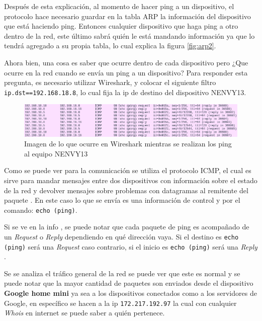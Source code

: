 \noindent Después de esta explicación, al momento de hacer ping a un dispositivo, el protocolo hace necesario guardar en la tabla ARP la información del dispositivo que está haciendo ping. Entonces cualquier dispositivo que haga ping a otro dentro de la red, este último sabrá quién le está mandando información ya que lo tendrá agregado a su propia tabla, lo cual explica la figura \ref{fig:arp2}. 


\noindent Ahora bien, una cosa es saber que ocurre dentro de cada dispositivo pero ¿Que ocurre en la red cuando se envía un ping a un dispositivo? Para responder esta pregunta, es necesario utilizar Wireshark, y colocar el siguiente filtro \verb|ip.dst==192.168.18.8|, lo cual fija la ip de destino del dispositivo NENVY13. 


\begin{figure}[!h]
	\centering
	\includegraphics[scale=0.5]{images/wire3.png}
	\caption{Imagen de lo que ocurre en Wireshark mientras se realizan los ping al equipo NENVY13}
	\label{diag:iperf3}
\end{figure}

\noindent Como se puede ver para la comunicación se utiliza el protocolo ICMP, el cual es sirve para mandar mensajes entre dos dispositivos con información sobre el estado de la red y devolver mensajes sobre problemas con datagramas al remitente del paquete \cite{icmp}. En este caso lo que se envía es una información de control y por el comando: \verb|echo (ping)|. 

\noindent Si se ve en la info , se puede notar que cada paquete de ping es acompañado de un \textit{Request} o \textit{Reply} dependiendo en qué dirección vaya. Si el destino es \verb|echo (ping)| será una \textit{Request} caso contrario, si el inicio es \verb|echo (ping)| será una \textit{Reply} .
\newline

\noindent Se se analiza el tráfico general de la red se puede ver que este es normal y se puede notar que la mayor cantidad de paquetes son enviados desde el dispositivo \textbf{Google home mini} ya sea a los dispositivos conectados como a los servidores de Google, en específico se hacen a la ip \verb|172.217.192.97| la cual con cualquier \textit{Whois} en internet se puede saber a quién pertenece.
